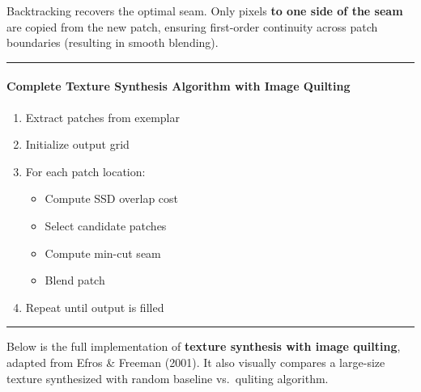 \documentclass[11pt]{article}
\providecommand{\tightlist}{%
      \setlength{\itemsep}{0pt}\setlength{\parskip}{0pt}}
\begin{document}
Backtracking recovers the optimal seam. Only pixels \textbf{to one side
of the seam} are copied from the new patch, ensuring first-order
continuity across patch boundaries (resulting in smooth blending).

\begin{center}\rule{0.5\linewidth}{0.5pt}\end{center}

\hypertarget{complete-texture-synthesis-algorithm-with-image-quilting}{%
\paragraph{\texorpdfstring{\textbf{Complete Texture Synthesis Algorithm
with Image
Quilting}}{Complete Texture Synthesis Algorithm with Image Quilting}}\label{complete-texture-synthesis-algorithm-with-image-quilting}}

\begin{enumerate}
\def\labelenumi{\arabic{enumi}.}
\item
  Extract patches from exemplar
\item
  Initialize output grid
\item
  For each patch location:

  \begin{itemize}
  \tightlist
  \item
    Compute SSD overlap cost
  \item
    Select candidate patches
  \item
    Compute min-cut seam
  \item
    Blend patch
  \end{itemize}
\item
  Repeat until output is filled
\end{enumerate}

\begin{center}\rule{0.5\linewidth}{0.5pt}\end{center}

Below is the full implementation of \textbf{texture synthesis with image
quilting}, adapted from Efros \& Freeman (2001). It also visually
compares a large-size texture synthesized with random baseline
vs.~quliting algorithm.
\end{document}

